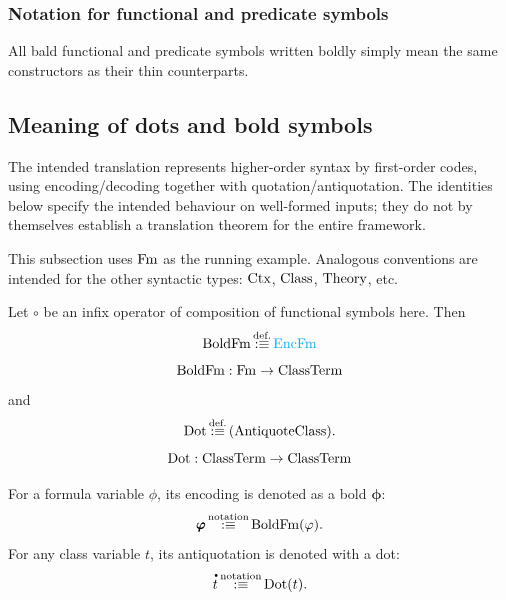 \subsubsection{Notation for functional and predicate symbols}
All bald functional and predicate symbols written boldly simply mean the same constructors as their thin counterparts.
\pagebreak

\fi %

\subsection{Meaning of dots and bold symbols}%
The intended translation represents higher-order syntax by first-order codes,
using encoding/decoding together with quotation/antiquotation. The identities
below specify the intended behaviour on well-formed inputs; they do not by
themselves establish a translation theorem for the entire framework.

This subsection uses $\mathrm{Fm}$ as the running example. Analogous conventions are intended for the other syntactic types: ${\text{Ctx}}$, ${\text{Class}}$, ${\text{Theory}}$, etc.%
\begin{definition}
Let $\circ$ be an infix operator of composition of functional symbols here. Then
\[
\text{BoldFm} \,{\stackrel{{\textrm{def.}}}{:\equiv}}\, {\text{\textcolor{cyan}{EncFm}}}
\]%
\[
\text{BoldFm} : \mathrm{Fm} \to {\text{ClassTerm}} 
\]
and
\[
\text{Dot} \equivdef (\text{AntiquoteClass}).%
\]
\[
\text{Dot} : {\text{ClassTerm}} \to {\text{ClassTerm}} 
\]

\end{definition}

\begin{notation}
For a formula variable $\phi$, its encoding is denoted as a bold $\pmb{\phi}$:
\[
\pmb{\varphi} \,{\stackrel{{\textrm{notation}}}{:\equiv}}\, \text{BoldFm}(\varphi).
\]
For any class variable $t$, its antiquotation is denoted with a dot:
\[
\meta{t} \equivnot \text{Dot}(t).
\]
\end{notation}

